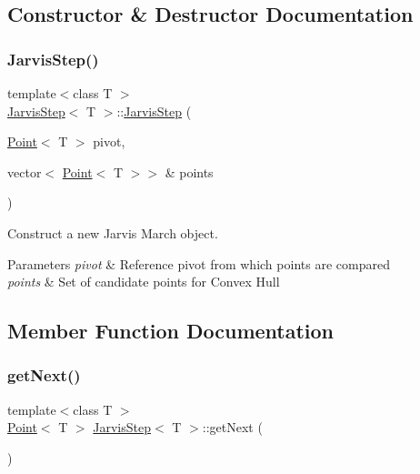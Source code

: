 \subsection{Constructor \& Destructor Documentation}
\mbox{\label{classJarvisStep_a92ed989e83f65b0ddeb17b2f4b278f2a}} 
\subsubsection{\texorpdfstring{Jarvis\+Step()}{JarvisStep()}}
{\footnotesize\ttfamily template$<$class T $>$ \\
\mbox{\hyperlink{classJarvisStep}{Jarvis\+Step}}$<$ T $>$\+::\mbox{\hyperlink{classJarvisStep}{Jarvis\+Step}} (\begin{DoxyParamCaption}\item[{\mbox{\hyperlink{classPoint}{Point}}$<$ T $>$}]{pivot,  }\item[{vector$<$ \mbox{\hyperlink{classPoint}{Point}}$<$ T $>$$>$ \&}]{points }\end{DoxyParamCaption})}



Construct a new Jarvis March object. 


\begin{DoxyParams}{Parameters}
{\em pivot} & Reference pivot from which points are compared \\
\hline
{\em points} & Set of candidate points for Convex Hull \\
\hline
\end{DoxyParams}


\subsection{Member Function Documentation}
\mbox{\label{classJarvisStep_a66f21d257e022fdeb8dc028bd2ac716c}} 
\subsubsection{\texorpdfstring{get\+Next()}{getNext()}}
{\footnotesize\ttfamily template$<$class T $>$ \\
\mbox{\hyperlink{classPoint}{Point}}$<$ T $>$ \mbox{\hyperlink{classJarvisStep}{Jarvis\+Step}}$<$ T $>$\+::get\+Next (\begin{DoxyParamCaption}{ }\end{DoxyParamCaption})}



